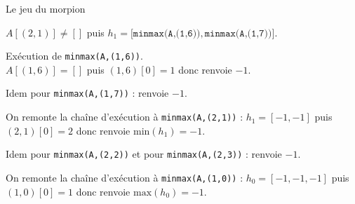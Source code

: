 \begin{exo}[PC][1][devoir]{Le jeu du morpion}
\begin{quest}
{\begin{liste}
\begin{liste}
        $A[(2,1)] \neq []$ puis $h_1=[\texttt{minmax(A,(1,6))},\texttt{minmax(A,(1,7))]}$.
        \begin{liste}
        \item  Exécution de \texttt{minmax(A,(1,6))}.\\
        $A[(1,6)] = []$ puis $(1,6)[0]=1$ donc renvoie $-1$.
        \item  Idem pour \texttt{minmax(A,(1,7))} : renvoie $-1$.
        \end{liste}
        \item On remonte la chaîne d’exécution à \texttt{minmax(A,(2,1))} : $h_1=[-1,-1]$ puis $(2,1)[0]=2$ donc renvoie $\text{min}(h_1)=-1$.
        \item Idem pour \texttt{minmax(A,(2,2))} et pour \texttt{minmax(A,(2,3))} : renvoie $-1$.
      \end{liste}
      \item On remonte la chaîne d’exécution à \texttt{minmax(A,(1,0))} : $h_0=[-1,-1,-1]$ puis $(1,0)[0]=1$ donc renvoie $\text{max}(h_0)=-1$.
  \end{liste}
  }
\end{quest}




\end{exo}
